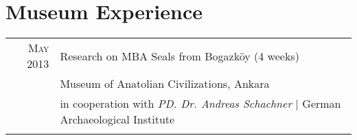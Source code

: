 \section{Museum Experience}

\begin{tabular}{r|l}	

\textsc{May 2013}  &  Research on MBA Seals from Bogazköy (4 weeks)\\
& Museum of Anatolian Civilizations, Ankara\\
& in cooperation with \emph{PD. Dr. Andreas Schachner}  | German Archaeological Institute\\
\multicolumn{2}{c}{} \\

\end{tabular}
